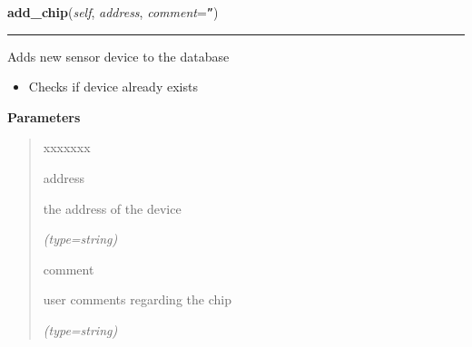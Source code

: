     \vspace{0.5ex}

\hspace{.8\funcindent}\begin{boxedminipage}{\funcwidth}

    \raggedright \textbf{add\_chip}(\textit{self}, \textit{address}, \textit{comment}={\tt ''})

    \vspace{-1.5ex}

    \rule{\textwidth}{0.5\fboxrule}
\setlength{\parskip}{2ex}
    Adds new sensor device to the database

    \begin{itemize}
    \setlength{\parskip}{0.6ex}
      \item Checks if device already exists

    \end{itemize}

\setlength{\parskip}{1ex}
      \textbf{Parameters}
      \vspace{-1ex}

      \begin{quote}
        \begin{Ventry}{xxxxxxx}

          \item[address]

          the address of the device

            {\it (type=string)}

          \item[comment]

          user comments regarding the chip

            {\it (type=string)}

        \end{Ventry}

      \end{quote}

    \end{boxedminipage}

    \label{DBE:DBE:add_to_group}

    \vspace{0.5ex}

